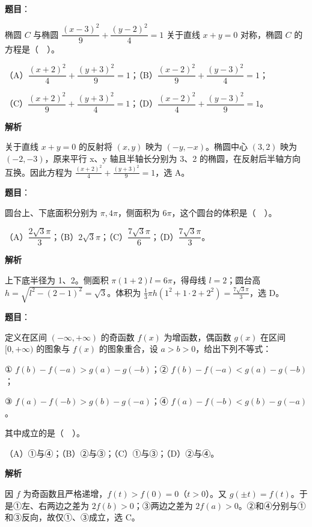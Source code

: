 \begin{answer}

\textbf{题目}：

椭圆 $C$ 与椭圆 $\dfrac{(x-3)^2}{9}+\dfrac{(y-2)^2}{4}=1$ 关于直线 $x+y=0$ 对称，椭圆 $C$ 的方程是（　）。

（A）$\dfrac{(x+2)^2}{4}+\dfrac{(y+3)^2}{9}=1$；（B）$\dfrac{(x-2)^2}{9}+\dfrac{(y-3)^2}{4}=1$；

（C）$\dfrac{(x+2)^2}{9}+\dfrac{(y+3)^2}{4}=1$；（D）$\dfrac{(x-2)^2}{4}+\dfrac{(y-3)^2}{9}=1$。

\textbf{解析}

关于直线 $x+y=0$ 的反射将 $(x,y)$ 映为 $(-y,-x)$。椭圆中心 $(3,2)$ 映为 $(-2,-3)$，原来平行 x、y 轴且半轴长分别为 3、2 的椭圆，在反射后半轴方向互换。因此方程为 $\frac{(x+2)^2}{4}+\frac{(y+3)^2}{9}=1$，选 A。


\end{answer}
\begin{answer}

\textbf{题目}：

圆台上、下底面积分别为 $\pi,4\pi$，侧面积为 $6\pi$，这个圆台的体积是（　）。

（A）$\dfrac{2\sqrt3\pi}{3}$；（B）$2\sqrt3\pi$；（C）$\dfrac{7\sqrt3\pi}{6}$；（D）$\dfrac{7\sqrt3\pi}{3}$。

\textbf{解析}

上下底半径为 1、2。侧面积 $\pi(1+2)l=6\pi$，得母线 $l=2$；圆台高 $h=\sqrt{l^2-(2-1)^2}=\sqrt3$。体积为 $\frac13\pi h(1^2+1\cdot2+2^2)=\frac{7\sqrt3\pi}{3}$，选 D。


\end{answer}
\begin{answer}

\textbf{题目}：

定义在区间 $(-\infty,+\infty)$ 的奇函数 $f(x)$ 为增函数，偶函数 $g(x)$ 在区间 $[0,+\infty)$ 的图象与 $f(x)$ 的图象重合，设 $a>b>0$，给出下列不等式：

① $f(b)-f(-a)>g(a)-g(-b)$；② $f(b)-f(-a)<g(a)-g(-b)$；

③ $f(a)-f(-b)>g(b)-g(-a)$；④ $f(a)-f(-b)<g(b)-g(-a)$。

其中成立的是（　）。

（A）①与④；（B）②与③；（C）①与③；（D）②与④。

\textbf{解析}

因 $f$ 为奇函数且严格递增，$f(t)>f(0)=0$（$t>0$）。又 $g(\pm t)=f(t)$。于是①左、右两边之差为 $2f(b)>0$；③两边之差为 $2f(a)>0$。②和④分别与①和③反向，故仅①、③成立，选 C。


\end{answer}
